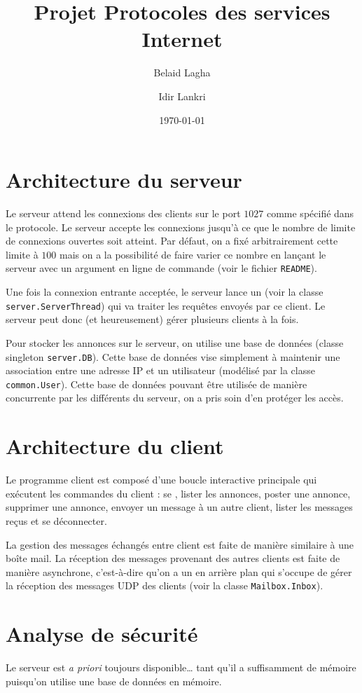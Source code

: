 \documentclass[12pt,english,french]{article}
\date{\today{}}
\author{Belaid Lagha \and{} Idir Lankri}
\title{Projet Protocoles des services Internet}
\newcommand{\texten}[1]{\texteng{\emph{#1}}}
\begin{document}
\maketitle{}

\section{Architecture du serveur}
Le serveur attend les connexions des clients sur le port $1027$ comme
spécifié dans le protocole.  Le serveur accepte les connexions jusqu'à
ce que le nombre de limite de connexions ouvertes soit atteint.  Par
défaut, on a fixé arbitrairement cette limite à $100$ mais on a la
possibilité de faire varier ce nombre en lançant le serveur avec un
argument en ligne de commande (voir le fichier \texttt{README}).

Une fois la connexion entrante acceptée, le serveur lance un
\texten{thread} (voir la classe \texttt{server.ServerThread}) qui va traiter
les requêtes envoyés par ce client.  Le serveur peut donc (et
heureusement) gérer plusieurs clients à la fois.

Pour stocker les annonces sur le serveur, on utilise une base de données
\texten{in-memory} (classe singleton \texttt{server.DB}).  Cette base de
données vise simplement à maintenir une association entre une adresse IP
et un utilisateur (modélisé par la classe \texttt{common.User}).  Cette
base de données pouvant être utilisée de manière concurrente par les
différents \texten{threads} du serveur, on a pris soin d'en protéger les
accès.

\section{Architecture du client}
Le programme client est composé d'une boucle interactive principale qui
exécutent les commandes du client : se \texten{logger}, lister les
annonces, poster une annonce, supprimer une annonce, envoyer un message
à un autre client, lister les messages reçus et se déconnecter.

La gestion des messages échangés entre client est faite de manière
similaire à une boîte mail.  La réception des messages provenant des
autres clients est faite de manière asynchrone, c'est-à-dire qu'on a un
\texten{thread} en arrière plan qui s'occupe de gérer la réception des
messages UDP des clients (voir la classe \texttt{Mailbox.Inbox}).

\section{Analyse de sécurité}
Le serveur est \emph{a priori} toujours disponible\dots{} tant qu'il
a suffisamment de mémoire puisqu'on utilise une base de données en
mémoire.
\end{document}
